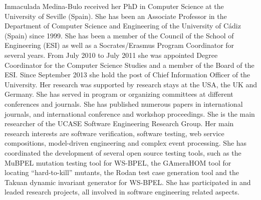 \documentclass[10pt,journal,compsoc]{IEEEtran}
\begin{document}
\begin{IEEEbiography}{Inmaculada Medina-Bulo}
	  received her PhD in Computer Science at the University of Seville (Spain). She has been an Associate Professor in the Department of Computer Science and Engineering of the University of C\'adiz (Spain) since 1999. She has been a member of the Council of the School of Engineering (ESI) as well as a Socrates/Erasmus Program Coordinator for several years. From July 2010 to July 2011 she was appointed Degree Coordinator for the Computer Science Studies and a member of the Board of the ESI. Since September 2013 she hold the post of Chief Information Officer of the University. Her research was supported by research stays at the USA, the UK and Germany. She has served in program or organizing committees at different conferences and journals. She has published numerous papers in international journals, and international conference and workshop proceedings. She is the main researcher of the UCASE Software Engineering Research Group. Her main research interests are software verification, software testing, web service compositions, model-driven engineering and complex event processing. She has coordinated the development of several open source testing tools, such as the MuBPEL mutation testing tool for WS-BPEL, the GAmeraHOM tool for locating ``hard-to-kill'' mutants, the Rodan test case generation tool and the Takuan dynamic invariant generator for WS-BPEL. She has participated in and leaded research projects, all involved in software engineering related aspects. 
\end{IEEEbiography}









\end{document}
